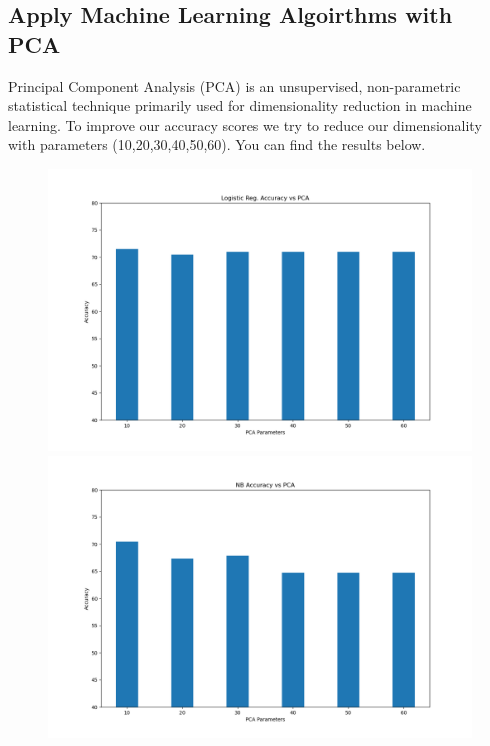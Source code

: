 \documentclass[onecolumn]{article}
\begin{document}
\subsection{Apply Machine Learning Algoirthms with PCA}
Principal Component Analysis (PCA) is an unsupervised, non-parametric statistical technique primarily used for dimensionality reduction in machine learning. To improve our accuracy scores we try to reduce our dimensionality with parameters (10,20,30,40,50,60). You can find the results below.
\begin{figure}[h]
    \centering
    \begin{minipage}{0.4\textwidth}
        \centering
        \includegraphics[width=1.3\textwidth]{pca_logistic.png} %
    \end{minipage}\hfill
    \begin{minipage}{0.4\textwidth}
        \centering
        \includegraphics[width=1.3\textwidth]{pca_NaiveBayes.png} %
    \end{minipage}
    \bigbreak
\end{figure}
\end{document}
